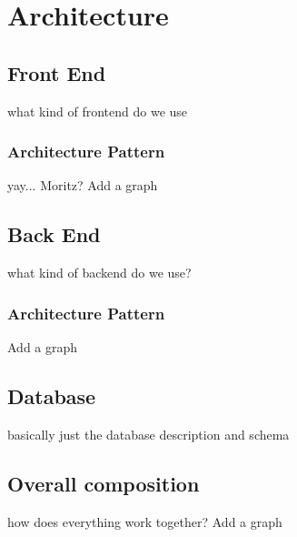 
\section{Architecture}
\label{sec:DomainC}

\subsection{Front End}
\label{sec:DomainCa}
what kind of frontend do we use
\subsubsection{Architecture Pattern}
yay... Moritz?
Add a graph


\subsection{Back End}
\label{sec:DomainCb}
what kind of backend do we use?
\subsubsection{Architecture Pattern}
Add a graph


\subsection{Database}
\label{sec:DomainCc}
basically just the database description and schema

\subsection{Overall composition}
\label{sec:DomainCd}
how does everything work together? Add a graph

